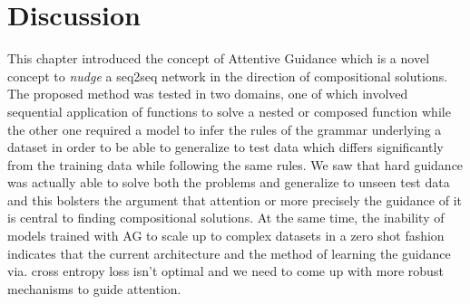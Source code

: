 \section{Discussion}\label{pm:disc}

This chapter introduced the concept of Attentive Guidance which is a novel concept to \textit{nudge} a seq2seq network in the direction of compositional solutions. The proposed method was tested in two domains, one of which involved sequential application of functions to solve a nested or composed function while the other one required a model to infer the rules of the grammar underlying a dataset in order to be able to generalize to test data which differs significantly from the training data while following the same rules. We saw that hard guidance was actually able to solve both the problems and generalize to unseen test data and this bolsters the argument that attention or more precisely the guidance of it is central to finding compositional solutions. At the same time, the inability of models trained with AG to scale up to complex datasets in a zero shot fashion indicates that the current architecture and the method of learning the guidance via. cross entropy loss isn't optimal and we need to come up with more robust mechanisms to guide attention.